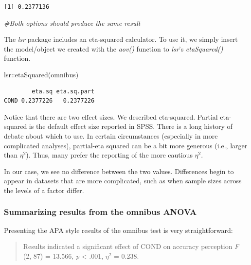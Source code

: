 \documentclass[
  11pt,
]{book}
\newenvironment{Shaded}{\begin{snugshade}}{\end{snugshade}}
\newcommand{\CommentTok}[1]{\textcolor[rgb]{0.56,0.35,0.01}{\textit{#1}}}
\newcommand{\FunctionTok}[1]{\textcolor[rgb]{0.00,0.00,0.00}{#1}}
\newcommand{\NormalTok}[1]{#1}
\newcommand{\SpecialCharTok}[1]{\textcolor[rgb]{0.00,0.00,0.00}{#1}}
\begin{document}
\begin{verbatim}
[1] 0.2377136
\end{verbatim}

\begin{Shaded}
\begin{Highlighting}[]
\CommentTok{\#Both options should produce the same result}
\end{Highlighting}
\end{Shaded}

The \emph{lsr} package includes an eta-squared calculator. To use it, we simply insert the model/object we created with the \emph{aov()} function to \emph{lsr}'s \emph{etaSquared()} function.

\begin{Shaded}
\begin{Highlighting}[]
\NormalTok{lsr}\SpecialCharTok{::}\FunctionTok{etaSquared}\NormalTok{(omnibus)}
\end{Highlighting}
\end{Shaded}

\begin{verbatim}
        eta.sq eta.sq.part
COND 0.2377226   0.2377226
\end{verbatim}

Notice that there are two effect sizes. We described eta-squared. Partial eta-squared is the default effect size reported in SPSS. There is a long history of debate about which to use. In certain circumstances (especially in more complicated analyses), partial-eta squared can be a bit more generous (i.e., larger than \(\eta^2\)). Thus, many prefer the reporting of the more cautious \(\eta^2\).

In our case, we see no difference between the two values. Differences begin to appear in datasets that are more complicated, such as when sample sizes across the levels of a factor differ.

\hypertarget{summarizing-results-from-the-omnibus-anova}{%
\subsubsection{Summarizing results from the omnibus ANOVA}\label{summarizing-results-from-the-omnibus-anova}}

Presenting the APA style results of the omnibus test is very straightforward:

\begin{quote}
Results indicated a significant effect of COND on accuracy perception \emph{F} (2, 87) = 13.566, \emph{p} \textless{} .001, \(\eta^2\) = 0.238.
\end{quote}
\end{document}
